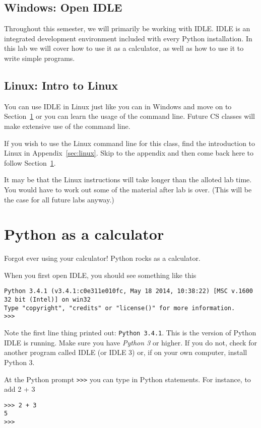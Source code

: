 \documentclass[12pt,hidelinks]{article}
\begin{document}
\subsection{Windows: Open IDLE}
Throughout this semester, we will primarily be working with IDLE. IDLE is an
integrated development environment included with every Python installation. In
this lab we will cover how to use it as a calculator, as well as how to use it
to write simple programs.

\subsection{Linux: Intro to Linux}

You can use IDLE in Linux just like you can in Windows and move on to
Section~\ref{sec:python-calc} or you can learn the usage of the command line.
Future CS classes will make extensive use of the command line.

If you wish to use the Linux command line for this class, find the introduction
to Linux in Appendix~\ref{sec:linux}. Skip to the appendix and then come back
here to follow Section~\ref{sec:python-calc}.

It may be that the Linux instructions will take longer than the alloted lab
time. You would have to work out some of the material after lab is over. (This
will be the case for all future labs anyway.)

\pagebreak
\section{Python as a calculator}
\label{sec:python-calc}
Forgot ever using your calculator! Python rocks as a calculator.

When you first open IDLE, you should see something like this
\begin{lstlisting}[style=bash]
Python 3.4.1 (v3.4.1:c0e311e010fc, May 18 2014, 10:38:22) [MSC v.1600 32 bit (Intel)] on win32
Type "copyright", "credits" or "license()" for more information.
>>> 
\end{lstlisting}

Note the first line thing printed out: \texttt{Python 3.4.1}. This is the
version of Python IDLE is running. Make sure you have \emph{Python 3} or higher.
If you do not, check for another program called IDLE (or IDLE 3) or, if on your
own computer, install Python 3.

At the Python prompt \texttt{>>>} you can type in Python statements. For instance, to add 2 + 3 
\begin{lstlisting}[style=bash]
>>> 2 + 3
5
>>>
\end{lstlisting}
\end{document}
